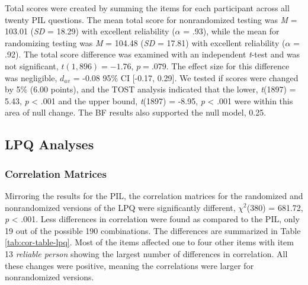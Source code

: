 \documentclass[english,man]{apa6}
\theoremstyle{definition}
\theoremstyle{definition}
\theoremstyle{definition}
\theoremstyle{remark}
\begin{document}
Total scores were created by summing the items for each participant
across all twenty PIL questions. The mean total score for nonrandomized
testing was \emph{M} = 103.01 (\emph{SD} = 18.29) with excellent
reliability (\(\alpha\) = .93), while the mean for randomizing testing
was \emph{M} = 104.48 (\emph{SD} = 17.81) with excellent reliability
(\(\alpha\) = .92). The total score difference was examined with an
independent \emph{t}-test and was not significant, \(t(1,896) = -1.76\),
\(p = .079\). The effect size for this difference was negligible,
\(d_{av}\) = -0.08 95\% CI {[}-0.17, 0.29{]}. We tested if scores were
changed by 5\% (6.00 points), and the TOST analysis indicated that the
lower, \emph{t}(1897) = 5.43, \emph{p} \textless{} .001 and the upper
bound, \emph{t}(1897) = -8.95, \emph{p} \textless{} .001 were within
this area of null change. The BF results also supported the null model,
0.25.

\subsection{LPQ Analyses}\label{lpq-analyses}

\subsubsection{Correlation Matrices}\label{correlation-matrices-1}

Mirroring the results for the PIL, the correlation matrices for the
randomized and nonrandomized versions of the LPQ were significantly
different, \(\chi^2\)(380) = 681.72, \emph{p} \textless{} .001. Less
differences in correlation were found as compared to the PIL, only 19
out of the possible 190 combinations. The differences are summarized in
Table \ref{tab:cor-table-lpq}. Most of the items affected one to four
other items with item 13 \emph{reliable person} showing the largest
number of differences in correlation. All these changes were positive,
meaning the correlations were larger for nonrandomized versions.
\end{document}
